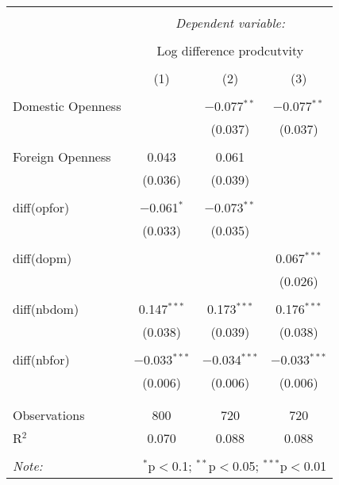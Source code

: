 
\begin{tabular}{@{\extracolsep{5pt}}lccc} 
\\[-1.8ex]\hline 
\hline \\[-1.8ex] 
 & \multicolumn{3}{c}{\textit{Dependent variable:}} \\ 
\cline{2-4} 
\\[-1.8ex] & \multicolumn{3}{c}{Log difference prodcutvity} \\ 
\\[-1.8ex] & (1) & (2) & (3)\\ 
\hline \\[-1.8ex] 
 Domestic Openness &  & $-$0.077$^{**}$ & $-$0.077$^{**}$ \\ 
  &  & (0.037) & (0.037) \\ 
  & & & \\ 
 Foreign Openness & 0.043 & 0.061 &  \\ 
  & (0.036) & (0.039) &  \\ 
  & & & \\ 
 diff(opfor) & $-$0.061$^{*}$ & $-$0.073$^{**}$ &  \\ 
  & (0.033) & (0.035) &  \\ 
  & & & \\ 
 diff(dopm) &  &  & 0.067$^{***}$ \\ 
  &  &  & (0.026) \\ 
  & & & \\ 
 diff(nbdom) & 0.147$^{***}$ & 0.173$^{***}$ & 0.176$^{***}$ \\ 
  & (0.038) & (0.039) & (0.038) \\ 
  & & & \\ 
 diff(nbfor) & $-$0.033$^{***}$ & $-$0.034$^{***}$ & $-$0.033$^{***}$ \\ 
  & (0.006) & (0.006) & (0.006) \\ 
  & & & \\ 
\hline \\[-1.8ex] 
Observations & 800 & 720 & 720 \\ 
R$^{2}$ & 0.070 & 0.088 & 0.088 \\ 
\hline 
\hline \\[-1.8ex] 
\textit{Note:}  & \multicolumn{3}{r}{$^{*}$p$<$0.1; $^{**}$p$<$0.05; $^{***}$p$<$0.01} \\ 
\end{tabular} 
